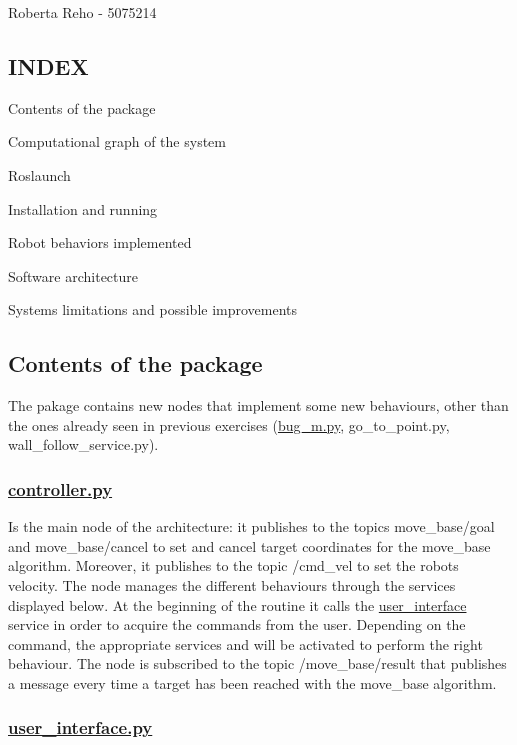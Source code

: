 Roberta Reho -\/ 5075214

\subsection*{I\+N\+D\+EX }


\begin{DoxyItemize}
\item Contents of the package
\item Computational graph of the system
\item Roslaunch
\item Installation and running
\item Robot behaviors implemented
\item Software architecture
\item System\textquotesingle{}s limitations and possible improvements
\end{DoxyItemize}

\subsection*{Contents of the package}

The pakage contains new nodes that implement some new behaviours, other than the ones already seen in previous exercises (\hyperlink{bug__m_8py}{bug\+\_\+m.\+py}, go\+\_\+to\+\_\+point.\+py, wall\+\_\+follow\+\_\+service.\+py).

\subsubsection*{\hyperlink{controller_8py}{controller.\+py}}

Is the main node of the architecture\+: it publishes to the topics move\+\_\+base/goal and move\+\_\+base/cancel to set and cancel target coordinates for the move\+\_\+base algorithm. Moreover, it publishes to the topic /cmd\+\_\+vel to set the robot\textquotesingle{}s velocity. The node manages the different behaviours through the services displayed below. At the beginning of the routine it calls the \hyperlink{namespaceuser__interface}{user\+\_\+interface} service in order to acquire the commands from the user. Depending on the command, the appropriate services and will be activated to perform the right behaviour. The node is subscribed to the topic /move\+\_\+base/result that publishes a message every time a target has been reached with the move\+\_\+base algorithm.

\subsubsection*{\hyperlink{user__interface_8py}{user\+\_\+interface.\+py}}

